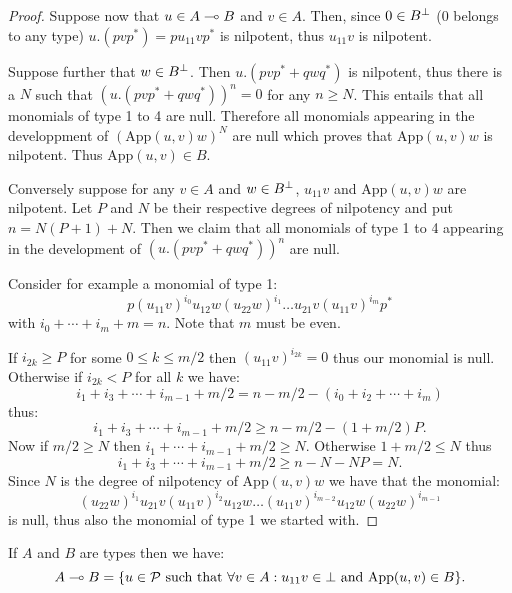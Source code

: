 \begin{proof}
Suppose now that $u\in A\multimap B$ and $v\in A$. Then, since $0\in B^\bot$ ($0$ belongs to any type) $u.(pvp^*) = pu_{11}vp^*$ is nilpotent, thus $u_{11}v$ is nilpotent.

Suppose further that $w\in B^\bot$. Then $u.(pvp^*+qwq^*)$ is nilpotent, thus there is a $N$ such that $(u.(pvp^* + qwq^*))^n=0$ for any $n\geq N$. This entails that all monomials of type 1 to 4 are null. Therefore all monomials appearing in the developpment of $(\mathrm{App}(u,v)w)^N$ are null which proves that $\mathrm{App}(u,v)w$ is nilpotent. Thus $\mathrm{App}(u,v)\in B$.

Conversely suppose for any $v\in A$ and $w\in B^\bot$, $u_{11}v$ and $\mathrm{App}(u,v)w$ are nilpotent. Let $P$ and $N$ be their respective degrees of nilpotency and put $n=N(P+1)+N$. Then we claim that all monomials of type 1 to 4 appearing in the development of $(u.(pvp^*+qwq^*))^n$ are null.

Consider for example a monomial of type 1:
\begin{equation*}
p(u_{11}v)^{i_0}u_{12}w(u_{22}w)^{i_1}\dots u_{21}v(u_{11}v)^{i_m}p^*
\end{equation*}
with $i_0+\cdots+i_m + m = n$. Note that $m$ must be even.

If $i_{2k}\geq P$ for some $0\leq k\leq m/2$ then $(u_{11}v)^{i_{2k}}=0$ thus our monomial is null. Otherwise if $i_{2k}<P$ for all $k$ we have:
\begin{equation*}
i_1+i_3+\cdots +i_{m-1} + m/2 = n - m/2 - (i_0+i_2+\cdots +i_m)
\end{equation*}
thus:
\begin{equation*}
i_1+i_3+\cdots +i_{m-1} + m/2\geq n - m/2 - (1+m/2)P.
\end{equation*}
Now if $m/2\geq N$ then $i_1+\cdots+i_{m-1}+m/2 \geq N$. Otherwise $1+m/2\leq N$ thus
\begin{equation*}
i_1+i_3+\cdots +i_{m-1} + m/2\geq n - N - NP = N.
\end{equation*}
Since $N$ is the degree of nilpotency of $\mathrm{App}(u,v)w$ we have that the monomial:
\begin{equation*}
(u_{22}w)^{i_1}u_{21}v(u_{11}v)^{i_2}u_{12}w\dots(u_{11}v)^{i_{m-2}}u_{12}w(u_{22}w)^{i_{m-1}}
\end{equation*}
is null, thus also the monomial of type 1 we started with.
\end{proof}

\begin{corollary}
If $A$ and $B$ are types then we have:
\begin{equation*}
A\multimap B = \{u\in\mathcal{P} \text{ such that }\forall v\in A: u_{11}v\in\bot\text{ and } \mathrm{App}(u, v)\in B\}.
\end{equation*}
\end{corollary}

